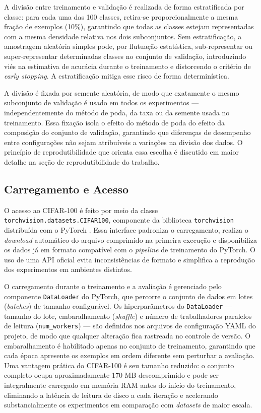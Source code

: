 A divisão entre treinamento e validação é realizada de forma estratificada por classe: para cada uma das 100 classes, retira-se proporcionalmente a mesma fração de exemplos (10\%), garantindo que todas as classes estejam representadas com a mesma densidade relativa nos dois subconjuntos. Sem estratificação, a amostragem aleatória simples pode, por flutuação estatística, sub-representar ou super-representar determinadas classes no conjunto de validação, introduzindo viés na estimativa de acurácia durante o treinamento e distorcendo o critério de \textit{early stopping}. A estratificação mitiga esse risco de forma determinística.

A divisão é fixada por semente aleatória, de modo que exatamente o mesmo subconjunto de validação é usado em todos os experimentos --- independentemente do método de poda, da taxa ou da semente usada no treinamento. Essa fixação isola o efeito do método de poda do efeito da composição do conjunto de validação, garantindo que diferenças de desempenho entre configurações não sejam atribuíveis a variações na divisão dos dados. O princípio de reprodutibilidade que orienta essa escolha é discutido em maior detalhe na seção de reprodutibilidade do trabalho.

\subsection{Carregamento e Acesso}\label{subsec:carregamento_dados}

O acesso ao CIFAR-100 é feito por meio da classe \texttt{torchvision.datasets.CIFAR100}, componente da biblioteca \texttt{torchvision} distribuída com o PyTorch \cite{Paszke2019}. Essa interface padroniza o carregamento, realiza o \textit{download} automático do arquivo comprimido na primeira execução e disponibiliza os dados já em formato compatível com o \textit{pipeline} de treinamento do PyTorch. O uso de uma API oficial evita inconsistências de formato e simplifica a reprodução dos experimentos em ambientes distintos.

O carregamento durante o treinamento e a avaliação é gerenciado pelo componente \texttt{DataLoader} do PyTorch, que percorre o conjunto de dados em lotes (\textit{batches}) de tamanho configurável. Os hiperparâmetros do \texttt{DataLoader} --- tamanho do lote, embaralhamento (\textit{shuffle}) e número de trabalhadores paralelos de leitura (\texttt{num\_workers}) --- são definidos nos arquivos de configuração YAML do projeto, de modo que qualquer alteração fica rastreada no controle de versão. O embaralhamento é habilitado apenas no conjunto de treinamento, garantindo que cada época apresente os exemplos em ordem diferente sem perturbar a avaliação. Uma vantagem prática do CIFAR-100 é seu tamanho reduzido: o conjunto completo ocupa aproximadamente 170 MB descomprimido e pode ser integralmente carregado em memória RAM antes do início do treinamento, eliminando a latência de leitura de disco a cada iteração e acelerando substancialmente os experimentos em comparação com \textit{datasets} de maior escala.


